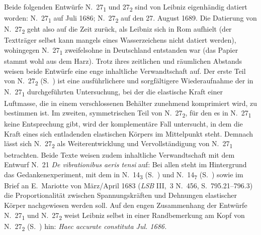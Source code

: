 %
%
%
%
%
\frenchspacing%
%
\footnotesize%
\pstart%
\noindent%
\label{LH_35_10_08_010-011+LH_35_10_08_015_Vorbemerkung}%
Beide folgenden Entwürfe N.~27\textsubscript{1} und 27\textsubscript{2} sind von Leibniz eigenhändig datiert worden: N.~27\textsubscript{1} auf Juli 1686; N.~27\textsubscript{2} auf den 27. August 1689.
Die Datierung von N.~27\textsubscript{2} geht also auf die Zeit zurück, als Leibniz sich in Rom\protect{} aufhielt (der Textträger selbst kann mangels eines Wasserzeichens nicht datiert werden), wohingegen N.~27\textsubscript{1} zweifelsohne in Deutschland\protect{} entstanden war (das Papier stammt wohl aus dem Harz).\protect{} 
Trotz ihres zeitlichen und räumlichen Abstands weisen beide Entwürfe eine enge inhaltliche Verwandtschaft auf.
Der erste Teil von N.~27\textsubscript{2} (S.~) ist eine ausführlichere und sorgfältigere Wiederaufnahme der in N.~27\textsubscript{1} durchgeführten Untersuchung, bei der die elastische Kraft einer Luftmasse, die in einem verschlossenen Behälter zunehmend komprimiert wird, zu bestimmen ist.
Im zweiten, symmetrischen Teil von N.~27\textsubscript{2}, für den es in N.~27\textsubscript{1} keine Entsprechung gibt, wird der komplementäre Fall untersucht, in dem die Kraft eines sich entladenden elastischen Körpers im Mittelpunkt steht.
Demnach lässt sich N.~27\textsubscript{2} als Weiterentwicklung und Vervollständigung von N.~27\textsubscript{1} betrachten.
Beide Texte weisen zudem inhaltliche Verwandtschaft mit dem Entwurf N.~21 \textit{De vibrationibus aeris tensi} auf: Bei allen steht im Hintergrund das Gedankenexperiment, mit dem in N.~14\textsubscript{3} (S.~) und N.~14\textsubscript{7} (S.~) sowie im Brief an E.~Mariotte von März/April 1683 (\textit{LSB} III,~3 N.~456, S.~795.21–796.3)\cite{01262} die Proportionalität zwischen Spannungskräften und Dehnungen elastischer Körper nachgewiesen werden soll.
\pend%
\pstart%
Auf den engen Zusammenhang der Entwürfe N.~27\textsubscript{1} und N.~27\textsubscript{2} weist Leibniz selbst in einer Randbemerkung am Kopf von N.~27\textsubscript{2} (S.~\pageref{LH_35_10_08_010r_Marg_1686}) hin: \textit{Haec accurate constituta Jul. 1686.}
